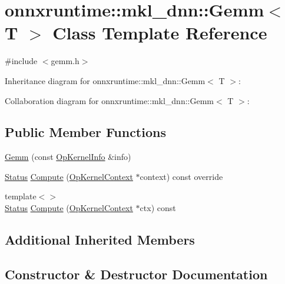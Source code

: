 \hypertarget{classonnxruntime_1_1mkl__dnn_1_1Gemm}{}\section{onnxruntime\+:\+:mkl\+\_\+dnn\+:\+:Gemm$<$ T $>$ Class Template Reference}
\label{classonnxruntime_1_1mkl__dnn_1_1Gemm}


{\ttfamily \#include $<$gemm.\+h$>$}



Inheritance diagram for onnxruntime\+:\+:mkl\+\_\+dnn\+:\+:Gemm$<$ T $>$\+:


Collaboration diagram for onnxruntime\+:\+:mkl\+\_\+dnn\+:\+:Gemm$<$ T $>$\+:
\subsection*{Public Member Functions}
\begin{DoxyCompactItemize}
\item 
\mbox{\hyperlink{classonnxruntime_1_1mkl__dnn_1_1Gemm_a5c5fcec9d18bf26b683c434246f069b6}{Gemm}} (const \mbox{\hyperlink{classonnxruntime_1_1OpKernelInfo}{Op\+Kernel\+Info}} \&info)
\item 
\mbox{\hyperlink{classonnxruntime_1_1common_1_1Status}{Status}} \mbox{\hyperlink{classonnxruntime_1_1mkl__dnn_1_1Gemm_a0d14fa413da1f16098f1e72c6a7a0256}{Compute}} (\mbox{\hyperlink{classonnxruntime_1_1OpKernelContext}{Op\+Kernel\+Context}} $\ast$context) const override
\item 
{\footnotesize template$<$$>$ }\\\mbox{\hyperlink{classonnxruntime_1_1common_1_1Status}{Status}} \mbox{\hyperlink{classonnxruntime_1_1mkl__dnn_1_1Gemm_ade0e8638249049ff3c42b8eb09b9d4ce}{Compute}} (\mbox{\hyperlink{classonnxruntime_1_1OpKernelContext}{Op\+Kernel\+Context}} $\ast$ctx) const
\end{DoxyCompactItemize}
\subsection*{Additional Inherited Members}


\subsection{Constructor \& Destructor Documentation}
\mbox{\label{classonnxruntime_1_1mkl__dnn_1_1Gemm_a5c5fcec9d18bf26b683c434246f069b6}} 
